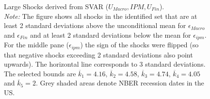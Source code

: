 \documentclass[a4paper,11pt,listof=nochaptergap,oneside,pointednumbers,bibtotoc,bigheadings,liststotoc,hidelinks]{scrbook}
\theoremstyle{mysatz}
\theoremstyle{mydefinition}
\theoremstyle{mytheorem}
\theoremstyle{mybemerkung}
\begin{document}
\begin{figure}[!h]
   \centering
   \setlength\fboxsep{0pt}
   \setlength\fboxrule{0pt}
      \caption[Large Shocks derived from SVAR ($U_{Macro}, IPM, U_{Fin}$).]{Large Shocks derived from SVAR ($U_{Macro}, IPM, U_{Fin}$).\\
      \textit{Note:}  The figure shows all shocks in the identified set that are at least 2 standard deviations above the unconditional mean for $\epsilon_{Macro}$ and $\epsilon_{Fin}$ and at least 2 standard deviations below the mean for $\epsilon_{ipm}$. For the middle pane ($\epsilon_{ipm}$) the sign of the shocks were flipped (so that negative shocks exceeding 2 standard deviations also point upwards). The horizontal line corresponds to 3 standard deviations. The selected bounds are $\overline{k}_1 = 4.16$, $\overline{k}_2 = 4.58$, $\overline{k}_3 = 4.74$, $\overline{k}_4 = 4.05$ and $\overline{k}_5 = 2$. Grey shaded areas denote NBER recession dates in the US.}   \label{fig:ludvigsonetal_timeseries_e_largeshocks}
\end{figure}
\end{document}
